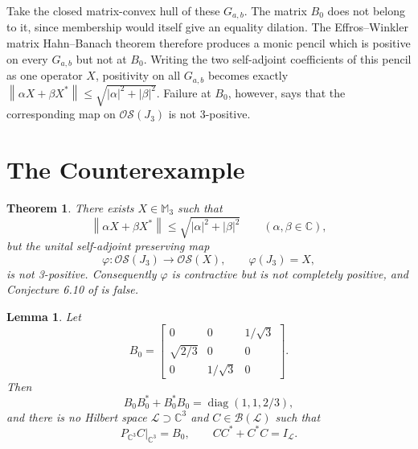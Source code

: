 \documentclass[11pt]{article}
\newtheorem{theorem}{Theorem}
\newtheorem{lemma}{Lemma}
\newcommand{\C}{\mathbb C}
\newcommand{\M}{\mathbb M}
\newcommand{\OS}{\mathcal{OS}}
\newcommand{\norm}[1]{\left\lVert #1\right\rVert}
\begin{document}
Take the closed matrix-convex hull of these \(G_{a,b}\). The matrix \(B_0\)
does not belong to it, since membership would itself give an equality
dilation. The Effros--Winkler matrix Hahn--Banach theorem therefore produces
a monic pencil which is positive on every \(G_{a,b}\) but not at \(B_0\).
Writing the two self-adjoint coefficients of this pencil as one operator
\(X\), positivity on all \(G_{a,b}\) becomes exactly
\(\norm{\alpha X+\beta X^*}\le\sqrt{|\alpha|^2+|\beta|^2}\).
Failure at \(B_0\), however, says that the corresponding map on
\(\OS(J_3)\) is not 3-positive.

\section*{The Counterexample}

\begin{theorem}\label{thm:counterexample}
There exists \(X\in\M_3\) such that
\begin{equation}\label{eq:norm-condition}
 \norm{\alpha X+\beta X^*}
 \le \sqrt{|\alpha|^2+|\beta|^2}
 \qquad(\alpha,\beta\in\C),
\end{equation}
but the unital self-adjoint preserving map
\[
 \varphi:\OS(J_3)\longrightarrow\OS(X),\qquad \varphi(J_3)=X,
\]
is not 3-positive. Consequently \(\varphi\) is contractive but is not
completely positive, and Conjecture 6.10 of \cite{DDM} is false.
\end{theorem}

\begin{lemma}\label{lem:no-dilation}
Let
\[
B_0=
\begin{bmatrix}
0&0&1/\sqrt3\\
\sqrt{2/3}&0&0\\
0&1/\sqrt3&0
\end{bmatrix}.
\]
Then
\[
B_0B_0^*+B_0^*B_0=\operatorname{diag}(1,1,2/3),
\]
and there is no Hilbert space \(\mathcal L\supset\C^3\) and
\(C\in\mathcal B(\mathcal L)\) such that
\[
 P_{\C^3}C|_{\C^3}=B_0,
 \qquad CC^*+C^*C=I_{\mathcal L}.
\]
\end{lemma}
\end{document}
